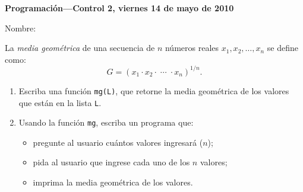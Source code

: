 \documentclass[12pt,spanish]{article}
\newcommand{\nombre}{%
  \framebox[0.8\textwidth]{\rule[2.3ex]{0pt}{0pt}}%
}
\begin{document}
  \thispagestyle{empty}
  {\Large\bfseries Programación---Control 2, viernes 14 de mayo de 2010}

  Nombre: \nombre
  \vspace{2em}

  La \emph{media geométrica} de una secuencia de $n$ números reales
  $x_1, x_2, \dots, x_n$ se define como:
  \[
    G = \left(x_1\cdot x_2\cdot\;\cdots\;\cdot x_n\right)^{1/n}.
  \]
  
  \begin{enumerate}
    \item Escriba una función \texttt{mg(L)},
      que retorne la media geométrica
      de los valores que están en la lista \texttt{L}.

      \framebox[\textwidth]{\rule[25ex]{0pt}{0pt}}
    \item Usando la función \texttt{mg},
      escriba un programa que:
      \begin{itemize}
        \item pregunte al usuario cuántos valores ingresará ($n$);
        \item pida al usuario que ingrese cada uno de los $n$ valores;
        \item imprima la media geométrica de los valores.
      \end{itemize}

      \framebox[\textwidth]{\rule[25ex]{0pt}{0pt}}



  \end{enumerate}
\end{document}
